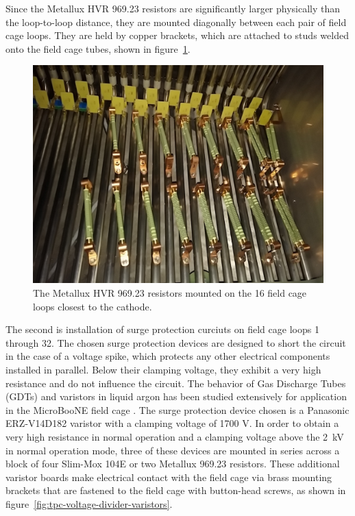 Since the Metallux HVR 969.23 resistors are significantly larger physically than the loop-to-loop distance, they are mounted diagonally between each pair of field cage loops. They are held by copper brackets, which are attached to studs welded onto the field cage tubes, shown in figure~\ref{fig:tpc-voltage-divider-metallux}.

\begin{figure}
\centering	
\includegraphics[width=0.8\linewidth]{figures/tpc-voltage-divider-metallux.jpg}
\caption{The Metallux HVR 969.23 resistors mounted on the 16 field cage loops closest to the cathode.}
\label{fig:tpc-voltage-divider-metallux}
\end{figure}


The second is installation of surge protection curciuts on field cage loops 1 through 32.  The chosen surge protection devices are designed to short the circuit in the case of a voltage spike, which protects any other electrical components installed in parallel.  Below their clamping voltage, they exhibit a very high resistance and do not influence the circuit. The behavior of Gas Discharge Tubes (GDTs) and varistors in liquid argon has been studied extensively for application in the MicroBooNE field cage \cite{Asaadi:2014iva}. The surge protection device chosen is a Panasonic ERZ-V14D182 varistor with a clamping voltage of 1700 V. In order to obtain a very high resistance in normal operation and a clamping voltage above the 2~kV in normal operation mode, three of these devices are mounted in series across a block of four Slim-Mox 104E or two Metallux 969.23 resistors. These additional varistor boards make electrical contact with the field cage via brass mounting brackets that are fastened to the field cage with button-head screws, as shown in figure~\ref{fig:tpc-voltage-divider-varistors}.

